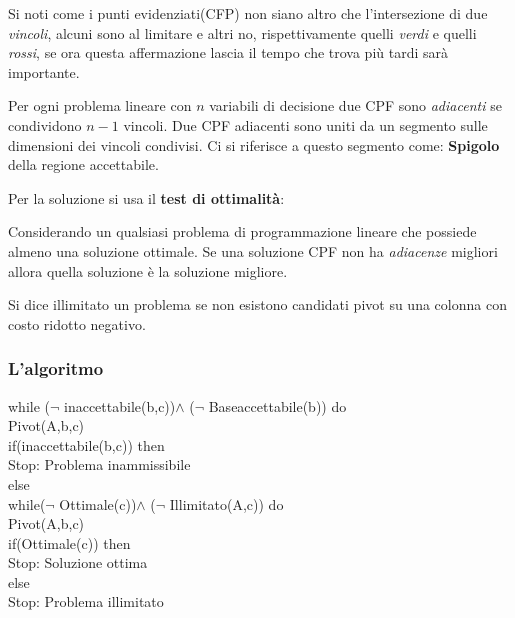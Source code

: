 \documentclass{article}
\begin{document}
Si noti come i punti evidenziati(CFP) non siano altro che l'intersezione di due \textit{vincoli}, alcuni sono al limitare e altri no, rispettivamente quelli \textit{verdi} e quelli \textit{rossi}, se ora questa affermazione lascia il tempo che trova più tardi sarà importante.

\begin{tcolorbox}[
    colback=lightgray,
    colframe=black,
    coltext=black,
    title=Definizione del simplesso,
    colbacktitle=black,
    coltitle=lightgray,
    breakable
  ]
  Per ogni problema lineare con $n$ variabili di decisione due CPF sono \textit{adiacenti} se condividono $n-1$ vincoli. Due CPF adiacenti sono uniti da un segmento sulle dimensioni dei vincoli condivisi. Ci si riferisce a questo segmento come: \textbf{Spigolo} della regione accettabile.
\end{tcolorbox}

Per la soluzione si usa il \textbf{test di ottimalità}:

\begin{tcolorbox}[
    colback=lightgray,
    colframe=black,
    coltext=black,
    title=Test di ottimalità,
    colbacktitle=black,
    coltitle=lightgray,
    breakable
  ]
  Considerando un qualsiasi problema di programmazione lineare che possiede almeno una soluzione ottimale. Se una soluzione CPF non ha \textit{adiacenze} migliori allora quella soluzione è la soluzione migliore.
\end{tcolorbox}


\begin{tcolorbox}[
    colback=lightgray,
    colframe=black,
    coltext=black,
    title=Test di illimitatezza,
    colbacktitle=black,
    coltitle=lightgray,
    breakable
  ]
  Si dice illimitato un problema se non esistono candidati pivot su una colonna con costo ridotto negativo.
\end{tcolorbox}

\subsubsection{L'algoritmo}
\begin{tcolorbox}[
    colback=lightgray,
    colframe=black,
    coltext=black,
    title=Algoritmo del simplesso,
    colbacktitle=black,
    coltitle=lightgray,
    breakable
  ]
  while ($\lnot$ inaccettabile(b,c))$\land$ ($\lnot$ Baseaccettabile(b)) do\\
  Pivot(A,b,c)\\
  if(inaccettabile(b,c)) then\\
  Stop: Problema inammissibile\\
  else\\
  while($\lnot$ Ottimale(c))$\land$ ($\lnot$ Illimitato(A,c)) do\\
  Pivot(A,b,c)\\
  if(Ottimale(c)) then\\
  Stop: Soluzione ottima\\
  else\\
  Stop: Problema illimitato\\
\end{tcolorbox}
\end{document}
